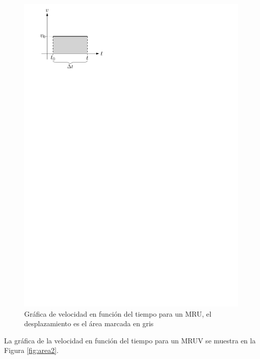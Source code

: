 \begin{figure}[!h]
\centering
\includegraphics{img/area.pdf}
\caption{Gráfica de velocidad en función del tiempo para un MRU, el desplazamiento es el área marcada en gris}
\label{fig:area}
\end{figure}

La gráfica de la velocidad en función del tiempo para un MRUV se muestra en la Figura \ref{fig:area2}.

